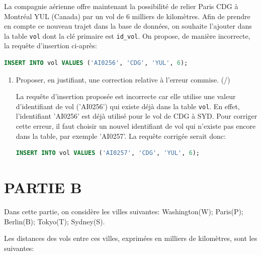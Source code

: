 \medskip

La compagnie aérienne offre maintenant la possibilité de relier Paris CDG à Montréal YUL (Canada) par un vol de 6 milliers de kilomètres. Afin de prendre en compte ce nouveau trajet dans la base de données, on souhaite l'ajouter dans la table \texttt{vol} dont la clé primaire est \texttt{id\_vol}. On propose, de manière incorrecte, la requête d'insertion ci-après:

\begin{lstlisting}[language=SQL]
INSERT INTO vol VALUES ('AI0256', 'CDG', 'YUL', 6);
\end{lstlisting}

\begin{enumerate}[resume=monDS]
    \item Proposer, en justifiant, une correction relative à l'erreur commise. (/)
\begin{blocvisible}[height=3.5]
    La requête d'insertion proposée est incorrecte car elle utilise une valeur d'identifiant de vol ('AI0256') qui existe déjà dans la table \texttt{vol}. En effet, l'identifiant 'AI0256' est déjà utilisé pour le vol de CDG à SYD. Pour corriger cette erreur, il faut choisir un nouvel identifiant de vol qui n'existe pas encore dans la table, par exemple 'AI0257'. La requête corrigée serait donc:
\begin{lstlisting}[language=SQL,frame=none, numbers=none]    
INSERT INTO vol VALUES ('AI0257', 'CDG', 'YUL', 6);
\end{lstlisting}
\end{blocvisible}
\end{enumerate}

\pagebreak
\section*{PARTIE B}

Dans cette partie, on considère les villes suivantes: Washington(W); Paris(P); Berlin(B); Tokyo(T); Sydney(S).

Les distances des vols entre ces villes, exprimées en milliers de kilomètres, sont les suivantes:

\medskip


